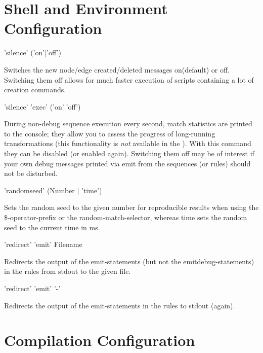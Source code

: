 \section{Shell and Environment Configuration}

\begin{rail}
'silence' ('on'|'off')
\end{rail}
Switches the new node/edge created/deleted messages on(default) or off.
Switching them off allows for much faster execution of scripts containing a lot of creation commands.

\begin{rail}
'silence' 'exec' ('on'|'off')
\end{rail}
During non-debug sequence execution every second, match statistics are printed to the console;
they allow you to assess the progress of long-running transformations (this functionality is \emph{not} available in the \GGrShell{}).
With this command they can be disabled (or enabled again).
Switching them off may be of interest if your own debug messages printed via emit from the sequences (or rules) should not be disturbed.

\begin{rail}
'randomseed' (Number | 'time')
\end{rail}
Sets the random seed to the given number for reproducible results when using the \$-operator-prefix or the random-match-selector, whereas time sets the random seed to the current time in ms.

\begin{rail}
'redirect' 'emit' Filename
\end{rail}
Redirects the output of the emit-statements (but not the emitdebug-statements) in the rules from stdout to the given file.

\begin{rail}
'redirect' 'emit' '-'
\end{rail}
Redirects the output of the emit-statements in the rules to stdout (again).


\section{Compilation Configuration}\label{sec:compilerconfigshell}

